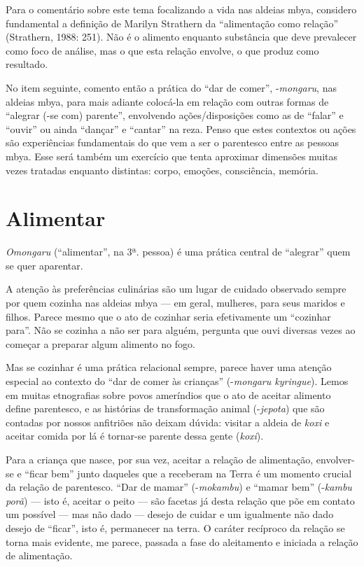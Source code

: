 Para o comentário sobre este tema focalizando a vida nas aldeias mbya,
considero fundamental a definição de Marilyn Strathern da ``alimentação
como relação'' (Strathern, 1988: 251). Não é o alimento enquanto
substância que deve prevalecer como foco de análise, mas o que esta
relação envolve, o que produz como resultado.

No item seguinte, comento então a prática do ``dar de comer'', -\emph{mongaru},
nas aldeias mbya, para mais adiante colocá-la em relação com outras
formas de ``alegrar (-se com) parente'', envolvendo ações/disposições
como as de ``falar'' e ``ouvir'' ou ainda ``dançar'' e ``cantar'' na reza. Penso que
estes contextos ou ações são experiências fundamentais do que vem a ser
o parentesco entre as pessoas mbya. Esse será também um exercício que
tenta aproximar dimensões muitas vezes tratadas enquanto distintas:
corpo, emoções, consciência, memória.

\section{Alimentar}

\emph{Omongaru} (``alimentar'', na 3ª. pessoa) é uma prática central de ``alegrar''
quem se quer aparentar.

A atenção às preferências culinárias são um lugar de cuidado observado
sempre por quem cozinha nas aldeias mbya --- em geral, mulheres, para
seus maridos e filhos. Parece mesmo que o ato de cozinhar seria
efetivamente um ``cozinhar para''. Não se cozinha a não ser para alguém,
pergunta que ouvi diversas vezes ao começar a preparar algum alimento
no fogo. 

Mas se cozinhar é uma prática relacional sempre, parece haver uma
atenção especial ao contexto do ``dar de comer às crianças'' (-\emph{mongaru
kyringue}). Lemos em muitas etnografias sobre povos ameríndios que o ato
de aceitar alimento define parentesco, e as histórias de transformação
animal (-\emph{jepota}) que são contadas por nossos anfitriões não deixam
dúvida: visitar a aldeia de \emph{koxi} e aceitar comida por lá é tornar-se
parente dessa gente (\emph{koxi}).

Para a criança que nasce, por sua vez, aceitar a relação de alimentação,
envolver-se e ``ficar bem'' junto daqueles que a receberam na Terra é um
momento crucial da relação de parentesco. ``Dar de mamar'' (-\emph{mokambu}) e
``mamar bem'' (-\emph{kambu porã}) --- isto é, aceitar o peito --- são facetas já
desta relação que põe em contato um possível --- mas não dado --- desejo de
cuidar e um igualmente não dado desejo de ``ficar'', isto é, permanecer na
terra. O caráter recíproco da relação se torna mais evidente, me
parece, passada a fase do aleitamento e iniciada a relação de
alimentação.

